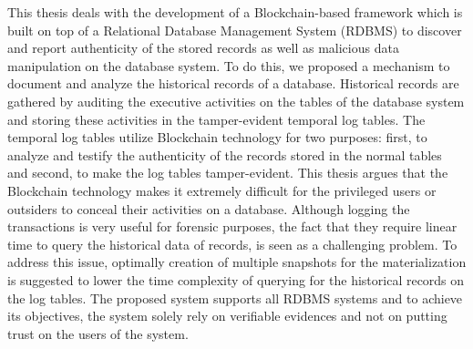 This thesis deals with the development of a Blockchain-based framework which is built on top of a Relational Database Management System (RDBMS) to discover and report authenticity of the stored records as well as malicious data manipulation on the database system. To do this, we proposed a mechanism to document and analyze the historical records of a database. Historical records are gathered by auditing the executive activities on the tables of the database system and storing these activities in the tamper-evident temporal log tables. The temporal log tables utilize Blockchain technology for two purposes: first, to analyze and testify the authenticity of the records stored in the normal tables and second, to make the log tables tamper-evident. This thesis argues that the Blockchain technology makes it extremely difficult for the privileged users or outsiders to conceal their activities on a database.  
Although logging the transactions is very useful for forensic purposes, the fact that they require linear time to query the historical data of records, is seen as a challenging problem. To address this issue, optimally creation of multiple snapshots for the materialization is suggested to lower the time complexity of querying for the historical records on the log tables.
The proposed system supports all RDBMS systems and to achieve its objectives, the system solely rely on verifiable evidences and not on putting trust on the users of the system.
